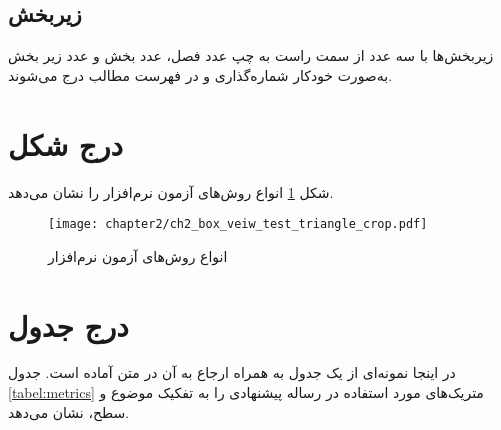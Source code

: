 \subsection{زیربخش}
زیربخش‌ها با سه عدد از سمت راست به چپ عدد فصل، عدد بخش و عدد زیر بخش به‌صورت خودکار شماره‌گذاری و در فهرست مطالب درج می‌شوند.

\section{درج شکل}
   شکل 
     \ref{fig:ch2_box_veiw_test_triangle_crop}
     انواع روش‌های  آزمون نرم‌افزار را نشان می‌دهد.
  
  
\begin{figure}
    \centering
    \texttt{[image: chapter2/ch2\_box\_veiw\_test\_triangle\_crop.pdf]}
    \caption[ انواع روش‌های آزمون نرم‌افزار]
    {
        انواع روش‌های آزمون نرم‌افزار
    }
    \label{fig:ch2_box_veiw_test_triangle_crop}
\end{figure}

\section{درج جدول}
در اینجا نمونه‌ای از یک جدول به همراه ارجاع به آن در متن آماده است.
جدول
\ref{tabel:metrics}
متریک‌های مورد استفاده در رساله پیشنهادی را به تفکیک موضوع و سطح، نشان می‌دهد.  

